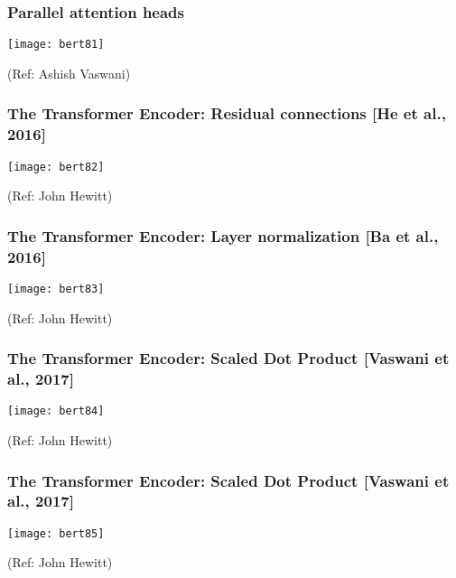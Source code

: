 \begin{frame}[fragile]\frametitle{Parallel attention heads}

			
			\begin{center}
			\texttt{[image: bert81]}
			\end{center}		
			
		
			{\tiny (Ref: Ashish Vaswani)}

\end{frame}

\begin{frame}[fragile]\frametitle{The Transformer Encoder: Residual connections [He et al., 2016]}

			
			\begin{center}
			\texttt{[image: bert82]}
			\end{center}		
			
		
			{\tiny (Ref: John Hewitt)}

\end{frame}

\begin{frame}[fragile]\frametitle{The Transformer Encoder: Layer normalization [Ba et al., 2016]}

			
			\begin{center}
			\texttt{[image: bert83]}
			\end{center}		
			
		
			{\tiny (Ref: John Hewitt)}

\end{frame}

\begin{frame}[fragile]\frametitle{The Transformer Encoder: Scaled Dot Product [Vaswani et al., 2017]}

			
			\begin{center}
			\texttt{[image: bert84]}
			\end{center}		
			
		
			{\tiny (Ref: John Hewitt)}

\end{frame}

\begin{frame}[fragile]\frametitle{The Transformer Encoder: Scaled Dot Product [Vaswani et al., 2017]}

			
			\begin{center}
			\texttt{[image: bert85]}
			\end{center}		
			
		
			{\tiny (Ref: John Hewitt)}

\end{frame}

